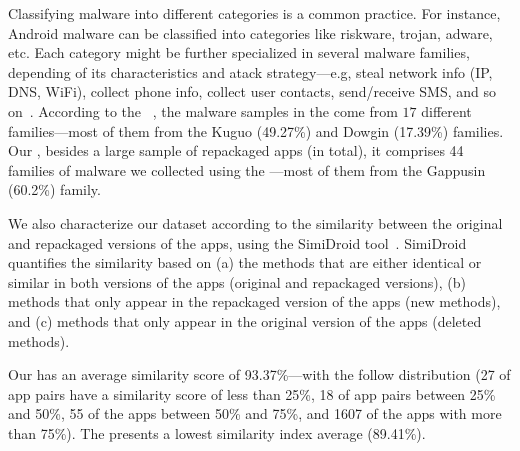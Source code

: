 Classifying malware into different categories is a common practice. For instance, Android malware can be classified into categories
like riskware, trojan, adware, etc. Each category might be further specialized in several malware families, depending of its
characteristics and atack strategy---e.g, steal network info (IP, DNS, WiFi), collect phone info,
collect user contacts, send/receive SMS, and so on~\cite{DBLP:conf/iccns/RahaliLKTGM20}.
According to the
\avt~\cite{avclass2-paper}, the malware samples in the \sds come from $17$ different families---most of them from the Kuguo (49.27\%) and Dowgin (17.39\%) families.
Our \cds, besides a large sample of repackaged apps (\apps in total), it
comprises 44 families of malware we collected using the \avt---most
of them from the Gappusin (60.2\%) family.

We also characterize our dataset according to the similarity
between the original and repackaged versions of the apps, using the  
SimiDroid tool~\cite{DBLP:conf/trustcom/0029BK17}. SimiDroid quantifies the similarity
based on (a) the methods that are either identical or similar in both versions of the apps (original and repackaged versions),
(b) methods that only appear in the repackaged version of the apps (new methods), and (c) methods that only appear in the
original version of the apps (deleted methods).

Our \cds has an average similarity score of 93.37\%---with the follow distribution {\color{red}(27 of
app pairs have a similarity score of less than 25\%, 18 of app pairs
between 25\% and 50\%,  55 of the apps between 50\% and 75\%,
and 1607 of the apps with more than 75\%). The \sds presents a lowest
similarity index average (89.41\%)}. 



